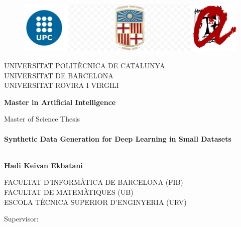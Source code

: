\begin{titlepage}
	
	\begin{figure}[t]
		\centering
		\includegraphics[scale=0.38]{images/upc_ub_urv3}
	\end{figure}    
	
	
	\begin{center}
		
		{\large \uppercase{Universitat politècnica de Catalunya}} \medskip \\
		{\large \uppercase{Universitat de Barcelona}} \medskip \\
		{\large \uppercase{Universitat Rovira i Virgili}} \medskip \\
		\vspace*{1cm}
		\begin{center}
			\Large	\bf   Master in Artificial Intelligence
		\end{center}
		

		{\Large Master of Science Thesis} \vspace*{1.0cm} \\
		\HRule \\[0.3cm]
		{ \huge \bfseries Synthetic Data Generation for Deep Learning in Small Datasets }\\[0.4cm] %
%
		\HRule \\[1.cm]
	\end{center}

	
	\thispagestyle{empty}
	\begin{center}
	\Large	\bf Hadi Keivan Ekbatani\\
	\end{center}
	\begin{center}
		{\large \uppercase{Facultat d'informàtica de Barcelona (FIB)}} \medskip \\
		{\large \uppercase{Facultat de Matemàtiques (UB)}} \medskip \\
		{\large \uppercase{Escola tècnica superior d'enginyeria (URV)}} \medskip \\
	\end{center}
	\vspace*{1.cm}
	\begin{center} 
		\begin{multicols}{2}	
		{\large Supervisor:}
		

\end{multicols}
\end{center}
\end{titlepage}
